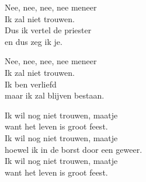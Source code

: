 \begin{translation}[No Me Caso]
Nee, nee, nee, nee meneer\\
Ik zal niet trouwen.\\
Dus ik vertel de priester\\
en dus zeg ik je.\vspace{\wlskip}

Nee, nee, nee, nee meneer\\
Ik zal niet trouwen.\\
Ik ben verliefd\\
maar ik zal blijven bestaan.\vspace{\wlskip}

Ik wil nog niet trouwen, maatje\\
want het leven is groot feest.\\
Ik wil nog niet trouwen, maatje\\
hoewel ik in de borst door een geweer.\\
Ik wil nog niet trouwen, maatje\\
want het leven is groot feest.\\

\end{translation}
